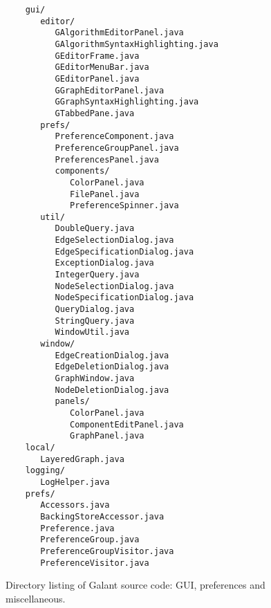 \begin{figure}

  \begin{center}
      \begin{minipage}{4in}
  \small
\begin{verbatim}
    gui/
       editor/
          GAlgorithmEditorPanel.java
          GAlgorithmSyntaxHighlighting.java
          GEditorFrame.java
          GEditorMenuBar.java
          GEditorPanel.java
          GGraphEditorPanel.java
          GGraphSyntaxHighlighting.java
          GTabbedPane.java
       prefs/
          PreferenceComponent.java
          PreferenceGroupPanel.java
          PreferencesPanel.java
          components/
             ColorPanel.java
             FilePanel.java
             PreferenceSpinner.java
       util/
          DoubleQuery.java
          EdgeSelectionDialog.java
          EdgeSpecificationDialog.java
          ExceptionDialog.java
          IntegerQuery.java
          NodeSelectionDialog.java
          NodeSpecificationDialog.java
          QueryDialog.java
          StringQuery.java
          WindowUtil.java
       window/
          EdgeCreationDialog.java
          EdgeDeletionDialog.java
          GraphWindow.java
          NodeDeletionDialog.java
          panels/
             ColorPanel.java
             ComponentEditPanel.java
             GraphPanel.java
    local/
       LayeredGraph.java
    logging/
       LogHelper.java
    prefs/
       Accessors.java
       BackingStoreAccessor.java
       Preference.java
       PreferenceGroup.java
       PreferenceGroupVisitor.java
       PreferenceVisitor.java
\end{verbatim}
      \end{minipage}
  \end{center}

  \medskip
  \caption{Directory listing of Galant source code: GUI, preferences and miscellaneous.}
  \label{fig:directory_listing_gui}
\end{figure}

